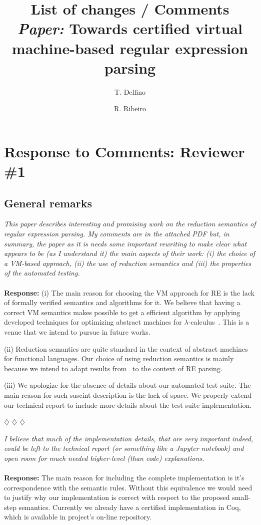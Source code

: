 \documentclass{article}
\title{List of changes / Comments \\ \textit{Paper:} Towards certified virtual machine-based regular expression parsing}
\author{T. Delfino \and R. Ribeiro}
\date{}
\newcommand{\separador}{\begin{center}
$\diamondsuit$ $\diamondsuit$ $\diamondsuit$
\end{center}}
\begin{document}
\maketitle

\section*{Response to Comments: Reviewer \#1}

\subsection*{General remarks}

\noindent\textit{This paper describes interesting and promising work on the reduction semantics of regular expression parsing.
My comments are in the attached PDF but, in summary, the paper as it is needs some important rewriting to
make clear what appears to be (as I understand it) the main aspects of their work:
(i) the choice of a VM-based approach,
(ii) the use of reduction semantics and
(iii) the properties of the automated testing.}
\\
\\
\noindent\textbf{Response:} (i) The main reason for choosing the VM approach for RE is the lack of formally verified semantics and
algorithms for it. We believe that having a correct VM semantics makes possible
to get a efficient algorithm by applying developed techniques
for optimizing abstract machines for $\lambda$-calculus~\cite{Johnson2013}. This is a venue that we intend to pursue in
future works.

(ii) Reduction semantics are quite standard in the context of abstract machines for functional languages. Our choice of using
reduction semantics is mainly because we intend to adapt results from~\cite{Johnson2013} to the context of RE parsing.

(iii) We apologize for the absence of details about our automated test suite. The main reason for such suscint description is the
lack of space. We properly extend our technical report to include more details about the test suite implementation.

\separador

\noindent\textit{I believe that much of the implementation details, that are very important indeed, could be left to the technical report
(or something like a Jupyter notebook) and open room for much needed higher-level (than code) explanations.}
\\
\\
\noindent\textbf{Response:} The main reason for including the complete implementation is it's correspondence with the
semantic rules. Without this equivalence we would need to justify why our implementation is correct with respect to
the proposed small-step semantics. Currently we already have a certified implementation in Coq, which is available in project's
on-line repository.
\end{document}
